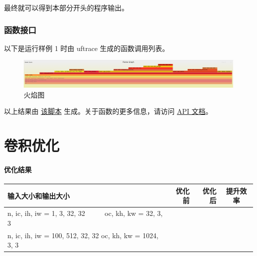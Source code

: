 \documentclass[UTF8]{ctexart}
\begin{document}
最终就可以得到本部分开头的程序输出。

\section{函数接口}

以下是运行样例 1 时由 uftrace\cite{uft} 生成的函数调用列表。


\begin{figure}[H]
    \centering
        \includegraphics[width=\textwidth]{img/flame.png}
    \caption{火焰图\cite{flame}}
    \label{fig:flame}
\end{figure}

以上结果由 \href{run:../opg/uftrace.sh}{该脚本} 生成。关于函数的更多信息，请访问 \href{run:../opg/target/doc/opg/index.html}{API 文档}。%

\part{卷积优化}
\subsection*{优化结果}
\begin{table}[H]
    \begin{tabular}{m{17em}rrc}
        \toprule
        输入大小和输出大小 & 优化前 & 优化后 & 提升效率 \\
        \midrule
        \ttfamily
        n, ic, ih, iw = 1, 3, 32, 32~~~~~
        oc, kh, kw = 32, 3, 3
        & & & \\
        \hline
        \ttfamily
        n, ic, ih, iw = 100, 512, 32, 32
        oc, kh, kw = 1024, 3, 3
        & & & \\
        \bottomrule
    \end{tabular}
\end{table}


\end{document}
